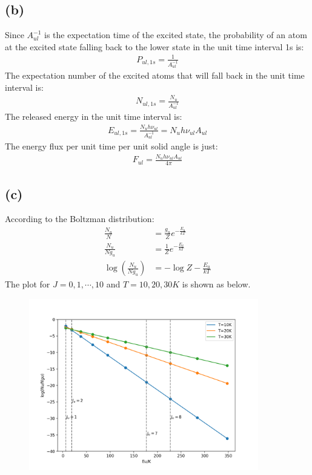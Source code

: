 \documentclass[a4paper,12pt]{article}
\begin{document}
\subsection*{(b)}
Since $A_{ul}^{-1}$ is the expectation time of the excited state, the probability of an atom at the excited state 
falling back to the lower state in the unit time interval 1s is:
\begin{align*}
    P_{ul, 1s} = \frac{1}{A_{ul}^{-1}}
\end{align*}
The expectation number of the excited atoms that will fall back in the unit time interval is:
\begin{align*}
    N_{ul, 1s} = \frac{N_u}{A_{ul}^{-1}}
\end{align*}
The released energy in the unit time interval is:
\begin{align*}
    E_{ul, 1s} = \frac{N_u h \nu_{ul}}{A_{ul}^{-1}} = N_u h \nu_{ul} A_{ul}
\end{align*}
The energy flux per unit time per unit solid angle is just:
\begin{align*}
    F_{ul} = \frac{N_u h \nu_{ul} A_{ul}}{4\pi}
\end{align*}

\subsection*{(c)}
According to the Boltzman distribution:
\begin{align*}
    \frac{N_u}{N} &= \frac{g_u}{Z} e^{-\frac{E_u}{kT}} \\
    \frac{N_u}{N g_u} &= \frac{1}{Z} e^{-\frac{E_u}{kT}} \\
    \log (\frac{N_u}{N g_u}) &= -\log Z - \frac{E_u}{kT}
\end{align*}
The plot for $J=0, 1, \cdots, 10$ and $T=10, 20, 30K$ is shown as below.

\begin{figure}[htbp]
    \centering
    \includegraphics*[width=10cm]{rotation.png}
\end{figure}
\end{document}
